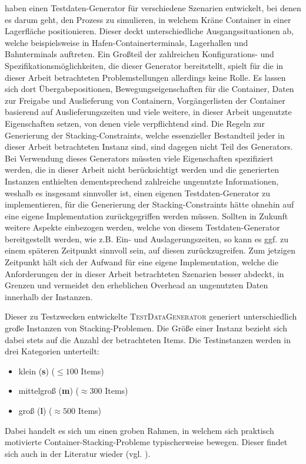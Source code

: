 \citet{Briskorn2018} haben einen Testdaten-Generator für verschiedene Szenarien entwickelt, bei denen
es darum geht, den Prozess zu simulieren, in welchem Kräne Container in einer Lagerfläche positionieren.
Dieser deckt unterschiedliche Ausgangssituationen ab, welche beispielsweise in Hafen-Containerterminals,
Lagerhallen und Bahnterminals auftreten.
Ein Großteil der zahlreichen Konfigurations- und Spezifikationsmöglichkeiten, die dieser
Generator bereitstellt, spielt für die in dieser Arbeit betrachteten Problemstellungen allerdings keine Rolle.
Es lassen sich dort Übergabepositionen, Bewegungseigenschaften für die Container, Daten zur Freigabe und Auslieferung von
Containern, Vorgängerlisten der Container basierend auf Auslieferungszeiten und viele weitere, in dieser Arbeit
ungenutzte Eigenschaften setzen, von denen viele verpflichtend sind. Die Regeln zur Generierung der Stacking-Constraints,
welche essenzieller Bestandteil jeder in dieser Arbeit betrachteten Instanz sind, sind dagegen nicht Teil des Generators.
Bei Verwendung dieses Generators müssten viele Eigenschaften spezifiziert werden, die in dieser Arbeit nicht
berücksichtigt werden und die generierten Instanzen enthielten dementsprechend zahlreiche ungenutzte Informationen,
weshalb es insgesamt sinnvoller ist, einen eigenen Testdaten-Generator zu implementieren, für die Generierung der
Stacking-Constraints hätte ohnehin auf eine eigene Implementation zurückgegriffen werden müssen.
Sollten in Zukunft weitere Aspekte einbezogen werden, welche von diesem Testdaten-Generator bereitgestellt
werden, wie z.B. Ein- und Auslagerungszeiten, so kann es ggf. zu einem späteren Zeitpunkt sinnvoll
sein, auf diesen zurückzugreifen. Zum jetzigen Zeitpunkt hält sich der Aufwand für eine eigene Implementation,
welche die Anforderungen der in dieser Arbeit betrachteten Szenarien besser abdeckt, in Grenzen und vermeidet den
erheblichen Overhead an ungenutzten Daten innerhalb der Instanzen.

Dieser zu Testzwecken entwickelte \textsc{TestDataGenerator} generiert unterschiedlich große Instanzen von Stacking-Problemen.
Die Größe einer Instanz bezieht sich dabei stets auf die Anzahl der betrachteten Items. Die Testinstanzen werden
in drei Kategorien unterteilt:
\begin{itemize}
  \item klein (\textbf{s}) ($\leq 100$ Items)
  \item mittelgroß (\textbf{m}) ($\approx 300$ Items)
  \item groß (\textbf{l}) ($\approx 500$ Items)\newline
\end{itemize}
Dabei handelt es sich um einen groben Rahmen, in welchem sich praktisch motivierte Container-Stacking-Probleme
typischerweise bewegen. Dieser findet sich auch in der Literatur wieder (vgl. \citet{Le2016}).

